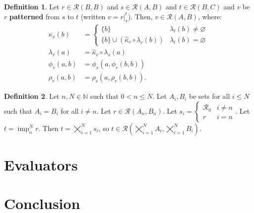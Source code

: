 \documentclass{article}
\theoremstyle{definition}
\newtheorem{definition}{Definition}[subsection]
\theoremstyle{plain}
\def\rule{\mathcal{R}}
\DeclareMathOperator{\imp}{imp}
\begin{document}
\begin{definition}
  Let $ r \in \rule (B, B) $
  and $ s \in \rule (A, B) $
  and $ t \in \rule (B, C) $
  and $ v $ be $ r $ \textbf{patterned} from $ s $ to $ t $
  (written $ v = r \rvert_{s}^{t} $).
  Then, $ v \in \rule (A, B) $, where:
  \begin{align}
      \kappa_v (b) & = \begin{cases}
                         \{ b \}                                               & \lambda_t (b) \neq \varnothing \\
                         \{ b \} \cup (\widehat{\kappa}_v \circ \lambda_r (b)) & \lambda_t (b) =    \varnothing
                       \end{cases} \\
  \lambda_v (a)    & = \widehat{\kappa}_v \circ \lambda_s (a) \\
     \phi_v (a, b) & = \phi_s (a, \phi_r (b, b)) \\
     \rho_v (a, b) & = \rho_s (a, \rho_r (b, b)).
  \end{align}
\end{definition}

\begin{definition}
  Let $ n, N \in \mathbb{N} $ such that $ 0 < n \leq N $.
  Let $ A_i, B_i $ be sets for all $ i \leq N $
  such  that $ A_i = B_i $ for all $ i \neq n $.
  Let $ r \in \rule (A_n, B_n)$.
  Let $ s_i = \begin{cases} \rule_0 & i \neq n \\ r & i = n \end{cases} $.
  Let $ t = \imp_n^N r $.
  Then $ t = \bigtimes_{i=1}^N s_i $,
  so $ t \in \rule (\bigtimes_{i=1}^N A_i, \bigtimes_{i=1}^N B_i) $.
\end{definition}

\section{Evaluators}

\section{Conclusion}
\end{document}

